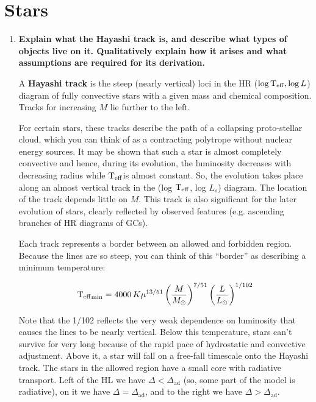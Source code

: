 \documentclass[12pt, letterpaper, preprint]{aastex}
\newcommand{\teff}{\mbox{$\rm T_{eff}$}}
\begin{document}
\section*{Stars}
\begin{enumerate}

  \item \textbf{Explain what the Hayashi track is, 
      and describe what types of objects live on it.
      Qualitatively explain how it arises and what 
      assumptions are required for its derivation.}
      
A \textbf{Hayashi track} is the steep (nearly vertical) loci in the HR ($\log \teff, \log L$) diagram of fully convective stars with a given mass and chemical composition. Tracks for increasing $M$ lie further to the left.

For certain stars, these tracks describe the path of a collapsing proto-stellar cloud, which you can think of as a contracting polytrope without nuclear energy sources. It may be shown that such a star is almost completely convective and hence, during its evolution, the luminosity decreases with decreasing radius while \teff is almost constant. So, the evolution takes place along an almost vertical track in the (log \teff, log $L_s$) diagram. The location of the track depends little on $M$.
This track is also significant for the later evolution of stars, clearly reflected by observed features (e.g. ascending branches of HR diagrams of GCs).

Each track represents a border between an allowed and forbidden region. Because the lines are so steep, you can think of this ``border'' as describing a minimum temperature:

\begin{equation}
\teff_\mathrm{min} = 4000\,K \mu^{13/51} \left( \frac{M}{M_\odot} \right)^{7/51} \left( \frac{L}{L_\odot} \right)^{1/102} 
\end{equation}

Note that the 1/102 reflects the very weak dependence on luminosity that causes the lines to be nearly vertical. Below this temperature, stars can't survive for very long because of the rapid pace of hydrostatic and convective adjustment. Above it, a star will fall on a free-fall timescale onto the Hayashi track. The stars in the allowed region have a small core with radiative transport. Left of the HL we have $\Delta < \Delta_\mathrm{ad}$ (so, some part of the model is radiative), on it we have $\Delta = \Delta_\mathrm{ad}$, and to the right we have $\Delta > \Delta_\mathrm{ad}$. 


\end{enumerate}
\end{document}
